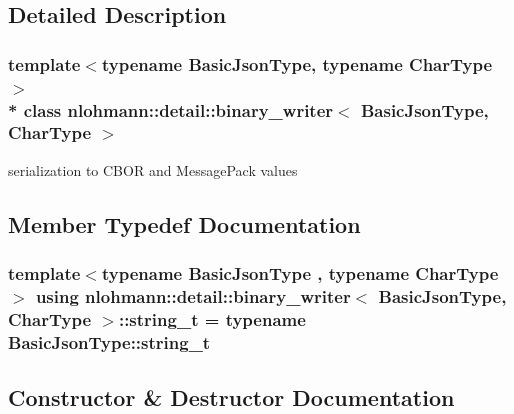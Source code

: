 \subsection{Detailed Description}
\subsubsection*{template$<$typename Basic\+Json\+Type, typename Char\+Type$>$\\*
class nlohmann\+::detail\+::binary\+\_\+writer$<$ Basic\+Json\+Type, Char\+Type $>$}

serialization to C\+B\+OR and Message\+Pack values 

\subsection{Member Typedef Documentation}
\subsubsection[{\texorpdfstring{string\+\_\+t}{string_t}}]{\setlength{\rightskip}{0pt plus 5cm}template$<$typename Basic\+Json\+Type , typename Char\+Type $>$ using {\bf nlohmann\+::detail\+::binary\+\_\+writer}$<$ Basic\+Json\+Type, Char\+Type $>$\+::{\bf string\+\_\+t} =  typename Basic\+Json\+Type\+::string\+\_\+t\hspace{0.3cm}{\ttfamily [private]}}\hypertarget{classnlohmann_1_1detail_1_1binary__writer_a29f2ae7a5c4a8c1dae47b3b2310de8a8}{}\label{classnlohmann_1_1detail_1_1binary__writer_a29f2ae7a5c4a8c1dae47b3b2310de8a8}


\subsection{Constructor \& Destructor Documentation}
